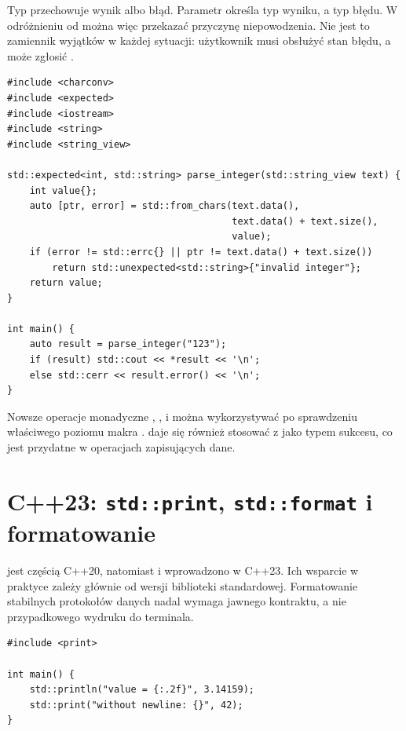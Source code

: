Typ  przechowuje wynik albo błąd. Parametr
 określa typ wyniku, a  typ błędu. W odróżnieniu od
 można więc przekazać przyczynę niepowodzenia.
Nie jest to zamiennik wyjątków w każdej sytuacji: użytkownik musi
obsłużyć stan błędu, a  może zgłosić
.

\begin{lstlisting}[caption={Parser z jawnym typem bledu (kompletny program C++23).}]
#include <charconv>
#include <expected>
#include <iostream>
#include <string>
#include <string_view>

std::expected<int, std::string> parse_integer(std::string_view text) {
    int value{};
    auto [ptr, error] = std::from_chars(text.data(),
                                        text.data() + text.size(),
                                        value);
    if (error != std::errc{} || ptr != text.data() + text.size())
        return std::unexpected<std::string>{"invalid integer"};
    return value;
}

int main() {
    auto result = parse_integer("123");
    if (result) std::cout << *result << '\n';
    else std::cerr << result.error() << '\n';
}
\end{lstlisting}

Nowsze operacje monadyczne , ,
 i  można wykorzystywać po
sprawdzeniu właściwego poziomu makra .
 daje się również stosować z  jako typem
sukcesu, co jest przydatne w operacjach zapisujących dane.

\section{C++23: \texttt{std::print}, \texttt{std::format} i formatowanie}

 jest częścią C++20, natomiast 
i  wprowadzono w C++23. Ich wsparcie w praktyce
zależy głównie od wersji biblioteki standardowej. Formatowanie
stabilnych protokołów danych nadal wymaga jawnego kontraktu, a nie
przypadkowego wydruku do terminala.

\begin{lstlisting}[caption={Formatowany wydruk C++23 (wymaga naglowka <print>).}]
#include <print>

int main() {
    std::println("value = {:.2f}", 3.14159);
    std::print("without newline: {}", 42);
}
\end{lstlisting}


